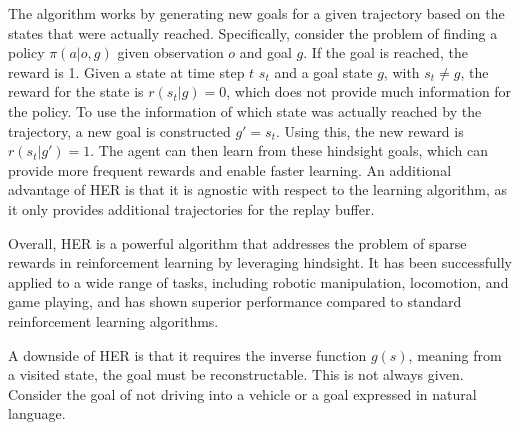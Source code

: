 The algorithm works by generating new goals for a given trajectory based on the states that were actually reached.
Specifically, consider the problem of finding a policy $\pi(a|o, g)$ given observation $o$ and goal $g$.
If the goal is reached, the reward is 1. Given a state at time step $t$ $s_t$ and a goal state $g$, with $s_t \neq g$,
the reward for the state is $r(s_t|g) = 0$, which does not provide much information for the policy.
To use the information of which state was actually reached by the trajectory, a new goal is constructed $g' = s_t$. Using this, the new reward is $r(s_t|g') = 1$.
The agent can then learn from these hindsight goals, which can provide more frequent rewards and enable faster learning. An additional advantage of HER is that it is agnostic with respect to the learning algorithm, as it only provides additional trajectories for the replay buffer.

Overall, HER is a powerful algorithm that addresses the problem of sparse rewards in reinforcement learning by leveraging hindsight. It has been successfully applied to a wide range of tasks, including robotic manipulation, locomotion, and game playing, and has shown superior performance compared to standard reinforcement learning algorithms.

A downside of HER is that it requires the inverse function $g(s)$, meaning from a visited state, the goal must be reconstructable. This is not always given.
Consider the goal of not driving into a vehicle or a goal expressed in natural language. \\


